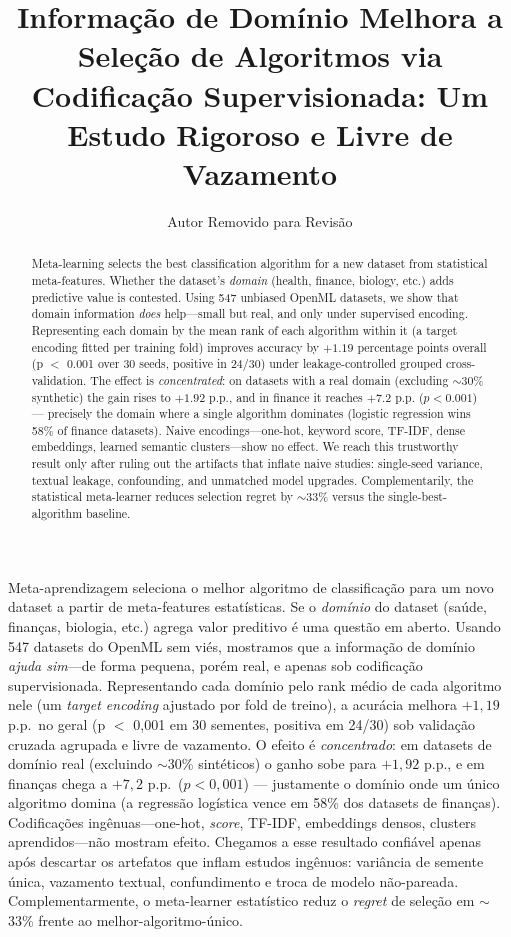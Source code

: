 \documentclass[12pt]{article}
\title{Informação de Domínio Melhora a Seleção de Algoritmos via Codificação
Supervisionada: Um Estudo Rigoroso e Livre de Vazamento}
\author{Autor Removido para Revisão}
\affil{Instituição Removida para Revisão\\
\email{email@exemplo.com}}
\begin{document}
\maketitle

\begin{abstract}
Meta-learning selects the best classification algorithm for a new dataset from
statistical meta-features. Whether the dataset's \emph{domain} (health, finance,
biology, etc.) adds predictive value is contested. Using 547 unbiased OpenML
datasets, we show that domain information \emph{does} help---small but real, and
only under supervised encoding. Representing each domain by the mean rank of each
algorithm within it (a target encoding fitted per training fold) improves accuracy by
$+1.19$ percentage points overall (p $<$ 0.001 over 30 seeds, positive in 24/30)
under leakage-controlled grouped cross-validation. The effect is
\emph{concentrated}: on datasets with a real domain (excluding $\sim$30\%
synthetic) the gain rises to $+1.92$ p.p., and in finance it reaches $+7.2$ p.p.
($p<0.001$) --- precisely the domain where a single algorithm dominates (logistic
regression wins 58\% of finance datasets). Naive encodings---one-hot, keyword
score, TF-IDF, dense embeddings, learned semantic clusters---show no effect. We reach this trustworthy
result only after ruling out the artifacts that inflate naive studies:
single-seed variance, textual leakage, confounding, and unmatched model upgrades.
Complementarily, the statistical meta-learner reduces selection regret by
$\sim$33\% versus the single-best-algorithm baseline.
\end{abstract}

\begin{resumo}
Meta-aprendizagem seleciona o melhor algoritmo de classificação para um novo
dataset a partir de meta-features estatísticas. Se o \emph{domínio} do dataset
(saúde, finanças, biologia, etc.) agrega valor preditivo é uma questão em aberto.
Usando 547 datasets do OpenML sem viés, mostramos que a informação de domínio
\emph{ajuda sim}---de forma pequena, porém real, e apenas sob codificação
supervisionada. Representando cada domínio pelo rank médio de cada algoritmo nele
(um \textit{target encoding} ajustado por fold de treino), a acurácia melhora
$+1{,}19$ p.p.\ no geral (p $<$ 0,001 em 30 sementes, positiva em 24/30) sob
validação cruzada agrupada e livre de vazamento. O efeito é \emph{concentrado}: em
datasets de domínio real (excluindo $\sim$30\% sintéticos) o ganho sobe para
$+1{,}92$ p.p., e em finanças chega a $+7{,}2$ p.p.\ ($p<0{,}001$) --- justamente o
domínio onde um único algoritmo domina (a regressão logística vence em 58\% dos
datasets de finanças). Codificações ingênuas---one-hot, \textit{score}, TF-IDF,
embeddings densos, clusters aprendidos---não mostram efeito. Chegamos a esse resultado confiável apenas após descartar os
artefatos que inflam estudos ingênuos: variância de semente única, vazamento
textual, confundimento e troca de modelo não-pareada. Complementarmente, o
meta-learner estatístico reduz o \textit{regret} de seleção em $\sim$33\% frente
ao melhor-algoritmo-único.
\end{resumo}
\end{document}
